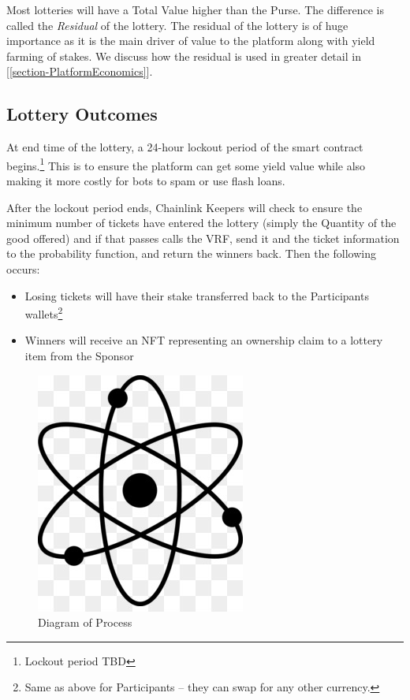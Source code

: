 \documentclass[runningheads]{llncs}
\begin{document}
Most lotteries will have a Total Value higher than the Purse.  The difference is called the \emph{Residual} of the lottery.  The residual of the lottery is of huge importance as it is the main driver of value to the platform along with yield farming of stakes.  We discuss how the residual is used in greater detail in [\ref{section-PlatformEconomics}].

\subsection{Lottery Outcomes}\label{subsection-LotteryOutcomes}
At end time of the lottery, a 24-hour lockout period of the smart contract begins.\footnote{Lockout period TBD}  This is to ensure the platform can get some yield value while also making it more costly for bots to spam or use flash loans. 

After the lockout period ends, Chainlink Keepers will check to ensure the minimum number of tickets have entered the lottery (simply the Quantity of the good offered) and if that passes calls the VRF, send it and the ticket information to the probability function, and return the winners back.  Then the following occurs:
\begin{itemize}
\item Losing tickets will have their stake transferred back to the Participants wallets\footnote{Same as above for Participants – they can swap for any other currency.}
\item Winners will receive an NFT representing an ownership claim to a lottery item from the Sponsor
\end{itemize}

\begin{figure}[H]
\centering
\includegraphics[scale=0.5]{Figures_and_Tables/atom.png}
\caption{Diagram of Process}
\end{figure}
\end{document}
